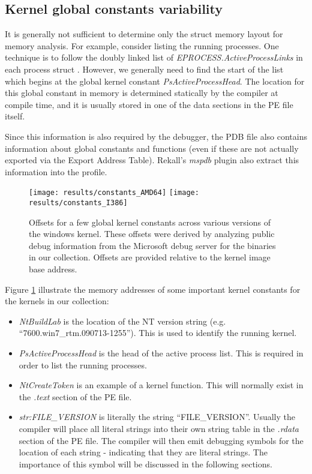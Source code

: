 \subsection{Kernel global constants variability}
It is generally not sufficient to determine only the struct memory layout for
memory analysis. For example, consider listing the running processes. One
technique is to follow the doubly linked list of {\em
  EPROCESS.ActiveProcessLinks} in each process struct
\citep{okolica2010windows}. However, we generally need to find the start of the
list which begins at the global kernel constant {\em PsActiveProcessHead}. The
location for this global constant in memory is determined statically by the
compiler at compile time, and it is usually stored in one of the data sections
in the PE file itself.

Since this information is also required by the debugger, the PDB file also
contains information about global constants and functions (even if these are not
actually exported via the Export Address Table). Rekall's {\em mspdb} plugin
also extract this information into the profile.

\begin{figure}[tb]
\begin{center}
\texttt{[image: results/constants\_AMD64]}
\texttt{[image: results/constants\_I386]}
\caption{Offsets for a few global kernel constants across various versions of
  the windows kernel. These offsets were derived by analyzing public debug
  information from the Microsoft debug server for the binaries in our
  collection. Offsets are provided relative to the kernel image base address.
}
\label{graph_constants}
\end{center}
\end{figure}

Figure \ref{graph_constants} illustrate the memory addresses of some important
kernel constants for the kernels in our collection:

\begin{itemize}
\item {\em NtBuildLab} is the location of the NT version string
  (e.g. ``7600.win7\_rtm.090713-1255''). This is used to identify the running
  kernel.

\item {\em PsActiveProcessHead} is the head of the active process list. This is
  required in order to list the running processes.

\item {\em NtCreateToken} is an example of a kernel function. This will normally
  exist in the {\em .text} section of the PE file.

\item {\em str:FILE\_VERSION} is literally the string ``FILE\_VERSION''. Usually
  the compiler will place all literal strings into their own string table in the
  {\em .rdata} section of the PE file. The compiler will then emit debugging
  symbols for the location of each string - indicating that they are literal
  strings. The importance of this symbol will be discussed in the following
  sections.

\end{itemize}


